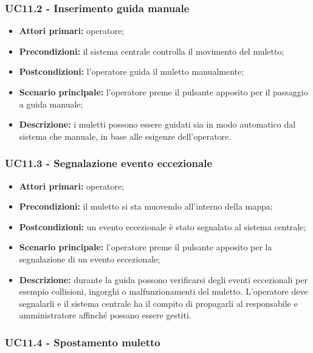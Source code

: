 \subsubsection{UC11.2 - Inserimento guida manuale}
\begin{itemize}
	\item 	\textbf{Attori primari:} operatore;
	\item 	\textbf{Precondizioni:} il sistema centrale controlla il movimento del muletto;
	\item 	\textbf{Postcondizioni:} l'operatore guida il muletto manualmente; 
	\item 	\textbf{Scenario principale:} l'operatore preme il pulsante apposito per il passaggio a guida manuale;
	\item 	\textbf{Descrizione:} i muletti possono essere guidati sia in modo automatico dal sistema che manuale, in base alle esigenze dell'operatore.
\end{itemize}

\subsubsection{UC11.3 - Segnalazione evento eccezionale}
\begin{itemize}
	\item 	\textbf{Attori primari:} operatore;
	\item 	\textbf{Precondizioni:} il muletto si sta muovendo all'interno della mappa;
	\item 	\textbf{Postcondizioni:} un evento eccezionale è stato segnalato al sistema centrale; 
	\item 	\textbf{Scenario principale:} l'operatore preme il pulsante apposito per la segnalazione di un evento eccezionale;
	\item 	\textbf{Descrizione:} durante la guida possono verificarsi degli eventi eccezionali per esempio collisioni, ingorghi o malfunzionamenti del muletto. L'operatore deve segnalarli e il sistema centrale ha il compito di propagarli al responsabile e amministratore affinché possano essere gestiti.

\end{itemize}

\subsubsection{UC11.4 - Spostamento muletto}

